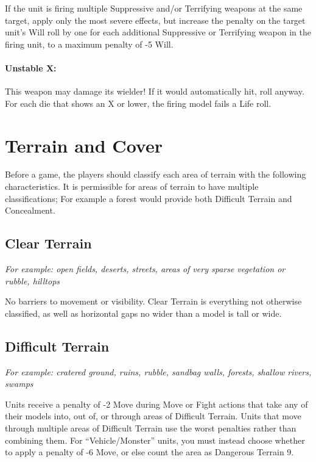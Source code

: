 \begin{multicols}{2}
If the unit is firing multiple Suppressive and/or Terrifying weapons at the same target, apply only the most severe effects, but increase the penalty on the target unit's Will roll by one for each additional Suppressive or Terrifying weapon in the firing unit, to a maximum penalty of -5 Will.

\subsubsection*{Unstable X:} This weapon may damage its wielder! If it would automatically hit, roll anyway. For each die that shows an X or lower, the firing model fails a Life roll.




\chapter*{Terrain and Cover}

Before a game, the players should classify each area of terrain with the following characteristics. It is permissible for areas of terrain to have multiple classifications; For example a forest would provide both Difficult Terrain and Concealment.




\section*{Clear Terrain}
\textit{For example: open fields, deserts, streets, areas of very sparse vegetation or rubble, hilltops}

No barriers to movement or visibility. Clear Terrain is everything not otherwise classified, as well as horizontal gaps no wider than a model is tall or wide.




\section*{Difficult Terrain}
\textit{For example: cratered ground, ruins, rubble, sandbag walls, forests, shallow rivers, swamps}

Units receive a penalty of -2 Move during Move or Fight actions that take any of their models into, out of, or through areas of Difficult Terrain. Units that move through multiple areas of Difficult Terrain use the worst penalties rather than combining them. For ``Vehicle/Monster'' units, you must instead choose whether to apply a penalty of -6 Move, or else count the area as Dangerous Terrain 9.





\end{multicols}
